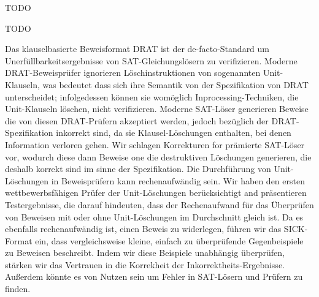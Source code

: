 \documentclass[draft,final]{vutinfth} %
\begin{document}
\frontmatter %

\addstatementpage

\begin{danksagung*}
    TODO
\end{danksagung*}

\begin{acknowledgements*}
    TODO
\end{acknowledgements*}
\fi

\begin{kurzfassung}

Das klauselbasierte Beweisformat DRAT ist der de-facto-Standard um
Unerfüllbarkeitsergebnisse von SAT-Gleichungslösern zu verifizieren.
Moderne DRAT-Beweisprüfer ignorieren Löschinstruktionen von
sogenannten Unit-Klauseln, was bedeutet dass sich ihre Semantik von der
Spezifikation von DRAT unterscheidet; infolgedessen können sie womöglich
Inprocessing-Techniken, die Unit-Klauseln löschen, nicht verifizieren.
Moderne SAT-Löser generieren Beweise die von diesen DRAT-Prüfern akzeptiert
werden, jedoch bezüglich der DRAT-Spezifikation inkorrekt sind, da sie
Klausel-Löschungen enthalten, bei denen Information verloren gehen.  Wir
schlagen Korrekturen for prämierte SAT-Löser vor, wodurch diese dann Beweise
one die destruktiven Löschungen generieren, die deshalb korrekt sind im sinne
der Spezifikation.  Die Durchführung von Unit-Löschungen in Beweisprüfern
kann rechenaufwändig sein.  Wir haben den ersten wettbewerbsfähigen Prüfer
der Unit-Löschungen berücksichtigt and präsentieren Testergebnisse, die
darauf hindeuten, dass der Rechenaufwand für das Überprüfen von Beweisen
mit oder ohne Unit-Löschungen im Durchschnitt gleich ist.  Da es ebenfalls
rechenaufwändig ist, einen Beweis zu widerlegen, führen wir das SICK-Format
ein, dass vergleichsweise kleine, einfach zu überprüfende Gegenbeispiele
zu Beweisen beschreibt. Indem wir diese Beispiele unabhängig überprüfen,
stärken wir das Vertrauen in die Korrekheit der Inkorrektheits-Ergebnisse.
Außerdem könnte es von Nutzen sein um Fehler in SAT-Lösern und Prüfern
zu finden.

\end{kurzfassung}

\begin{abstract}

\end{abstract}
\end{document}
